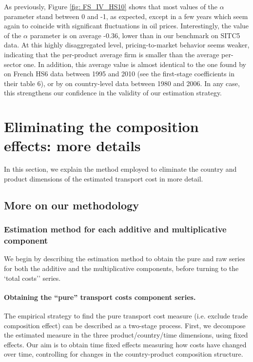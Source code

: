 \documentclass[a4paper,11pt]{article}
\begin{document}
As previously, Figure \ref{fig: FS_IV_HS10} shows that most values of the $\alpha$ parameter stand between 0 and -1, as expected, except in a few years which seem again to coincide with significant fluctuations in oil prices. Interestingly, the value of the $\alpha$ parameter is on average -0.36, lower than in our benchmark on SITC5 data. At this highly disaggregated level, pricing-to-market behavior seems weaker, indicating that the per-product average firm is smaller than the average per-sector one. In addition, this average value is almost identical to the one found by \citet{Fontagne_Martin_Orefice2018} on French HS6 data between 1995 and 2010 (see the first-stage coefficients in their table 6), or by \citet{Bussiere2013} on country-level data between 1980 and 2006. In any case, this strengthens our confidence in the validity of our estimation strategy.

\clearpage
\setcounter{table}{0}
\setcounter{figure}{0}
\renewcommand{\thefigure}{C.\arabic{figure}}
\renewcommand{\thetable}{C.\arabic{table}}




\section{Eliminating the composition effects: more details \label{app:comp-effects}}

In this section, we explain the method employed to eliminate the country and product dimensions of the estimated transport cost in more detail.

\subsection{More on our methodology}


\subsubsection{Estimation method for each additive and multiplicative component}

We begin by describing the estimation method to obtain the pure and raw series for both the additive and the multiplicative components, before turning to the `total costs'' series.
\smallskip

\paragraph{Obtaining the ``pure'' transport costs component series.} The empirical strategy to find the pure transport cost measure (i.e. exclude trade composition effect) can be described as a two-stage process.
First, we decompose the estimated measure in the three product/country/time dimensions, using fixed effects. Our aim is to obtain time fixed effects measuring how costs have changed over time, controlling for changes in the country-product composition structure.\smallskip
\end{document}
